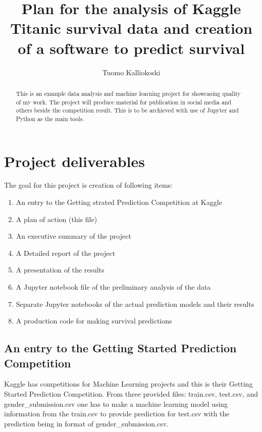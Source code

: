 \documentclass{article}
\begin{document}
\title{Plan for the analysis of Kaggle Titanic survival data and creation of a software to predict survival}
\author{Tuomo Kalliokoski}

\maketitle

\begin{abstract}
This is an example data analysis and machine learning project for showcasing quality of my work. The project will produce material for publication in social media and others beside the competition result. This is to be archieved with use of Jupyter and Python as the main tools.
\end{abstract}

\section{Project deliverables}
The goal for this project is creation of following items: 
\begin{enumerate}
	\item An entry to the Getting strated Prediction Competition at Kaggle
	\item A plan of action (this file)
	\item An executive summary of the project
	\item A Detailed report of the project
	\item A presentation of the results
	\item A Jupyter notebook file of the preliminary analysis of the data
	\item Separate Jupyter notebooks of the actual prediction models and their results
	\item A production code for making survival predictions
\end{enumerate}

\subsection{An entry to the Getting Started Prediction Competition}
Kaggle has competitions for Machine Learning projects and this is their Getting Started Prediction Competition. From three provided files: train.csv, test.csv, and gender\_submission.csv one has to make a machine learning model using information from the train.csv to provide prediction for test.csv with the prediction being in format of gender\_submission.csv.
 
\end{document}
